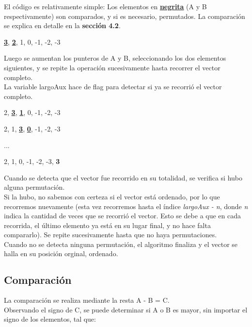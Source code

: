 \documentclass{sciposter}
\begin{document}
\begin{multicols*}{2}
El código es relativamente simple:
Los elementos en \underline{\textbf{negrita}} (A y B respectivamente) son comparados, y si es necesario, permutados. La comparación se explica en detalle en la \textbf{sección 4.2}.

\begin{center}
    \underline{\textbf{3}}, \underline{\textbf{2}}, 1, 0, -1, -2, -3
\end{center}

Luego se aumentan los punteros de A y B, seleccionando los dos elementos siguientes, y se repite la operación sucesivamente hasta recorrer el vector completo.\\
La variable largoAux hace de flag para detectar si ya se recorrió el vector completo.
\begin{center}
    2, \underline{\textbf{3}}, \underline{\textbf{1}}, 0, -1, -2, -3
\end{center}
\begin{center}
    2, 1, \underline{\textbf{3}}, \underline{\textbf{0}}, -1, -2, -3
\end{center}
\begin{center}
    ...
\end{center}
\begin{center}
    2, 1, 0, -1, -2, -3, \textbf{3}
\end{center}

Cuando se detecta que el vector fue recorrido en su totalidad, se verifica si hubo alguna permutación.\\
Si la hubo, no sabemos con certeza si el vector está ordenado, por lo que recorremos nuevamente (esta vez recorremos hasta el índice \textit{largoAux - n}, donde \textit{n} indica la cantidad de veces que se recorrió el vector. Esto se debe a que en cada recorrida, el último elemento ya está en su lugar final, y no hace falta compararlo). Se repite sucesivamente hasta que no haya permutaciones.\\
Cuando no se detecta ninguna permutación, el algoritmo finaliza y el vector se halla en su posición orginal, ordenado.\\

\subsection{Comparación}

La comparación se realiza mediante la resta A - B = C.\\
Observando el signo de C, se puede determinar si A o B es mayor, sin importar el signo de los elementos, tal que:\\


\end{multicols*}
\end{document}
